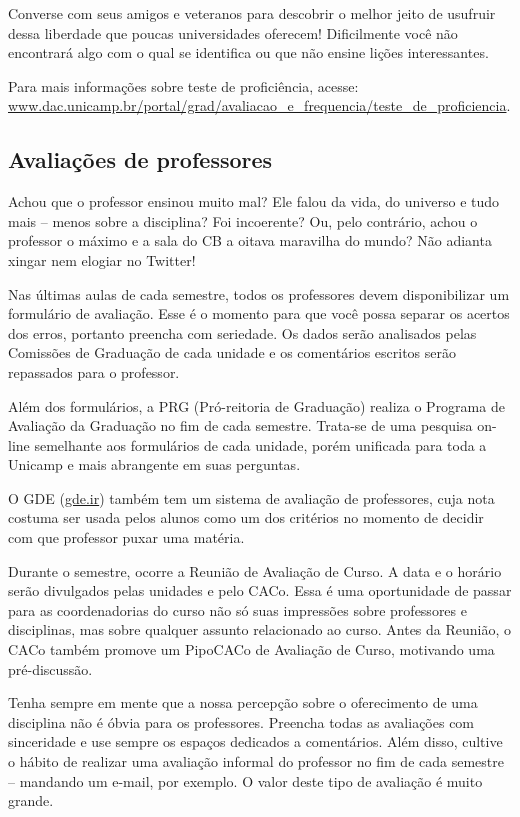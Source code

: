 Converse com seus amigos e veteranos para descobrir o melhor jeito de usufruir
dessa liberdade que poucas universidades oferecem! Dificilmente você não
encontrará algo com o qual se identifica ou que não ensine lições interessantes.

Para mais informações sobre teste de proficiência, acesse:
\url{www.dac.unicamp.br/portal/grad/avaliacao_e_frequencia/teste_de_proficiencia}.

\subsection{Avaliações de professores}

Achou que o professor ensinou muito mal? Ele falou da vida, do universo e tudo
mais -- menos sobre a disciplina? Foi incoerente? Ou, pelo contrário, achou o
professor o máximo e a sala do CB a oitava maravilha do mundo? Não adianta
xingar nem elogiar no Twitter!

Nas últimas aulas de cada semestre, todos os professores devem disponibilizar um
formulário de avaliação. Esse é o momento para que você possa separar os acertos
dos erros, portanto preencha com seriedade. Os dados serão analisados pelas
Comissões de Graduação de cada unidade e os comentários escritos serão repassados
para o professor.

Além dos formulários, a PRG (Pró-reitoria de Graduação) realiza o Programa de
Avaliação da Graduação no fim de cada semestre. Trata-se de uma pesquisa on-line
semelhante aos formulários de cada unidade, porém unificada para toda a Unicamp
e mais abrangente em suas perguntas.

O GDE (\url{gde.ir}) também tem um sistema de avaliação de professores, cuja nota
costuma ser usada pelos alunos como um dos critérios no momento de decidir com
que professor puxar uma matéria.

Durante o semestre, ocorre a Reunião de Avaliação de Curso. A data e o horário
serão divulgados pelas unidades e pelo CACo. Essa é uma oportunidade de passar
para as coordenadorias do curso não só suas impressões sobre professores e disciplinas,
mas sobre qualquer assunto relacionado ao curso. Antes da Reunião, o CACo também
promove um PipoCACo de Avaliação de Curso, motivando uma pré-discussão.

Tenha sempre em mente que a nossa percepção sobre o oferecimento de uma disciplina
não é óbvia para os professores. Preencha todas as avaliações com sinceridade
e use sempre os espaços dedicados a comentários. Além disso, cultive o hábito de
realizar uma avaliação informal do professor no fim de cada semestre -- mandando
um e-mail, por exemplo. O valor deste tipo de avaliação é muito grande.

